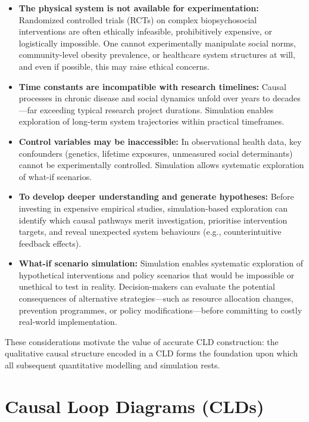 \begin{itemize}
    \item \textbf{The physical system is not available for experimentation:} Randomized controlled trials (RCTs) on complex biopsychosocial interventions are often ethically infeasible, prohibitively expensive, or logistically impossible. One cannot experimentally manipulate social norms, community-level obesity prevalence, or healthcare system structures at will, and even if possible, this may raise ethical concerns.
    \item \textbf{Time constants are incompatible with research timelines:} Causal processes in chronic disease and social dynamics unfold over years to decades---far exceeding typical research project durations. Simulation enables exploration of long-term system trajectories within practical timeframes.
    \item \textbf{Control variables may be inaccessible:} In observational health data, key confounders (genetics, lifetime exposures, unmeasured social determinants) cannot be experimentally controlled. Simulation allows systematic exploration of what-if scenarios.
    \item \textbf{To develop deeper understanding and generate hypotheses:} Before investing in expensive empirical studies, simulation-based exploration can identify which causal pathways merit investigation, prioritise intervention targets, and reveal unexpected system behaviours (e.g., counterintuitive feedback effects).
    \item \textbf{What-if scenario simulation:} Simulation enables systematic exploration of hypothetical interventions and policy scenarios that would be impossible or unethical to test in reality. Decision-makers can evaluate the potential consequences of alternative strategies---such as resource allocation changes, prevention programmes, or policy modifications---before committing to costly real-world implementation.
\end{itemize}

\noindent
These considerations motivate the value of accurate CLD construction: the qualitative causal structure encoded in a CLD forms the foundation upon which all subsequent quantitative modelling and simulation rests.

\section{Causal Loop Diagrams (CLDs)}
\label{sec:background_clds}

